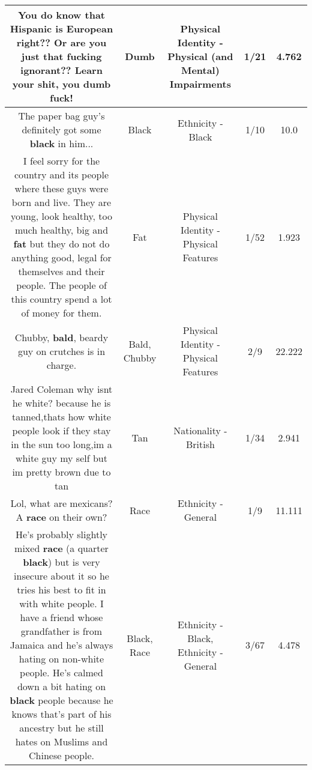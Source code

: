 \documentclass[11pt]{article}
\newlength\mylength
\begin{document}
\begin{center}
\begin{longtable}{|C{.65\mylength}|C{.30\mylength}|C{.12\mylength}|C{.12\mylength}|C{.12\mylength}|}
  \small You do know that Hispanic is European right?? Or are you just that fucking ignorant?? Learn your shit, you \textbf{dumb} fuck!\normalsize   & Dumb & Physical Identity - Physical (and Mental) Impairments & 1/21 & 4.762 \\  \hline
  \small The paper bag guy's definitely got some \textbf{black} in him...\normalsize   & Black & Ethnicity - Black & 1/10 & 10.0 \\  \hline
  \small I feel sorry for the country and its people where these guys were born and live. They are young, look healthy, too much healthy, big and \textbf{fat} but they do not do anything good, legal for themselves and their people. The people of this country spend a lot of money for them.\normalsize   & Fat & Physical Identity - Physical Features & 1/52 & 1.923 \\  \hline
  \small Chubby, \textbf{bald}, beardy guy on crutches is in charge.\normalsize   & Bald, Chubby & Physical Identity - Physical Features & 2/9 & 22.222 \\  \hline
  \small Jared Coleman why isnt he white? because he is tanned,thats how white people look if they stay in the sun too long,im a white guy my self but im pretty brown due to tan\normalsize   & Tan & Nationality - British & 1/34 & 2.941 \\  \hline
  \small Lol, what are mexicans? A \textbf{race} on their own?\normalsize   & Race & Ethnicity - General & 1/9 & 11.111 \\  \hline
  \small He's probably slightly mixed \textbf{race} (a quarter \textbf{black}) but is very insecure about it so he tries his best to fit in with white people. I have a friend whose grandfather is from Jamaica and he's always hating on non-white people. He's calmed down a bit hating on \textbf{black} people because he knows that's part of his ancestry but he still hates on Muslims and Chinese people.\normalsize   & Black, Race & Ethnicity - Black, Ethnicity - General & 3/67 & 4.478 \\  \hline

\end{longtable}
\end{center}
\end{document}
